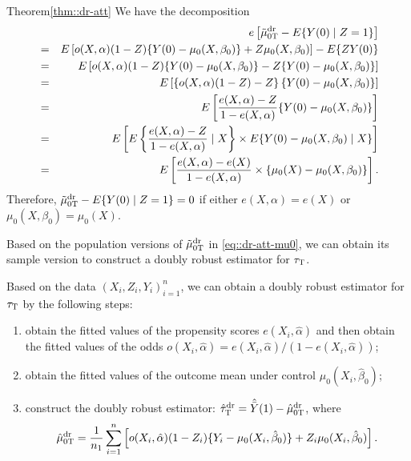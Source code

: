 \begin{myproof}{Theorem}{\ref{thm::dr-att}}
We have the decomposition
\begin{eqnarray*}
&&  e\left[  \tilde{\mu}_{0\textsc{T}}^\text{dr}  -  E\{ Y(0) \mid Z=1 \} \right] \\
&=& E\left[ o(X,\alpha) ( 1-Z )  \{ Y(0) - \mu_0(X, \beta_0) \} + Z  \mu_0(X, \beta_0) \right] -  E\{ Z Y(0)   \} \\
&=& E\left[ o(X,\alpha) ( 1-Z ) \{ Y(0) - \mu_0(X, \beta_0) \} - Z  \{ Y (0) - \mu_0(X, \beta_0) \} \right] \\
&=& E\left[ \left\{ o(X,\alpha)  ( 1-Z  ) -Z\right\} \{ Y (0) - \mu_0(X, \beta_0) \}   \right] \\
&=& E\left[    \frac{ e(X,\alpha) - Z  }{1-  e(X,\alpha)}   \{ Y (0) - \mu_0(X, \beta_0) \}   \right] \\
&=& E\left[  E\left\{   \frac{ e(X,\alpha) - Z  }{1-  e(X,\alpha)}  \mid X \right\}  \times E  \{ Y (0) - \mu_0(X, \beta_0)  \mid X\}   \right] \\
&=& E\left[   \frac{ e(X,\alpha) - e(X)  }{1-  e(X,\alpha)} \times    \{ \mu_0(X) - \mu_0(X, \beta_0)  \}   \right] .
\end{eqnarray*}
Therefore, $\tilde{\mu}_{0\textsc{T}}^\text{dr}  -  E\{ Y(0) \mid Z=1 \}  = 0$
 if either $ e(X,\alpha) = e(X)$ or $\mu_0(X, \beta_0)=\mu_0(X) $. 
\end{myproof}


Based on the population versions of $\tilde{\mu}_{0\textsc{T}}^\text{dr}$ in \eqref{eq::dr-att-mu0}, we can obtain its sample version to construct a doubly robust estimator for $\tau_\textsc{T}$. 

\begin{definition}
\label{def::dr-att}
Based on the data $(X_i, Z_i, Y_i)_{i=1}^n$, we can obtain a doubly robust estimator for $\tau_\textsc{T}$ by the following steps: 
\begin{enumerate}
[(1)]
\item
obtain the fitted values of the propensity scores $e(X_i, \hat{\alpha})$ and then obtain the fitted values of the odds $o(X_i, \hat{\alpha})  =  e(X_i, \hat{\alpha}) / (1- e(X_i, \hat{\alpha}))$; 
\item
obtain the fitted values of the outcome mean under control $ \mu_0(X_i, \hat{\beta}_0) $; 
\item
construct the doubly robust estimator: $\hat{\tau}_\textsc{T}^\textup{dr} = \hat{\bar{Y}}(1) - \hat{\mu}_{0\textsc{T}}^\textup{dr}$, where
$$
 \hat{\mu}_{0\textsc{T}}^\textup{dr}  
 = \frac{1}{n_1} \sum_{i=1}^n \left[ o(X_i,\hat{\alpha}) (1-Z_i)\{ Y_i-\mu_0(X_i, \hat{\beta}_0) \}      +Z_i \mu_0(X_i, \hat{\beta}_0)       \right].
$$
\end{enumerate}
\end{definition}


